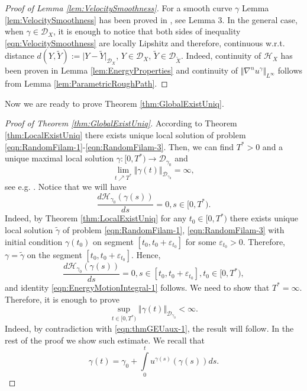 \documentclass[11pt,a4paper,leqno]{amsart}%
\theoremstyle{plain}
\theoremstyle{remark}
\theoremstyle{plain}
\numberwithin{equation}{section}
\newcommand{\eps}{\varepsilon}
\def\liml{\lim\limits}
\def\supl{\sup\limits}
\def\intl{\int\limits}
\def\supl{\mathop{\sup}\limits}
\begin{document}
\begin{proof}[Proof of Lemma \ref{lem:VelocitySmoothness}]
For a smooth curve $\gamma$ Lemma \ref{lem:VelocitySmoothness} has been proved in
\cite{[Bers+Gub_2007]}, see  Lemma 3. In the general case, when
$\gamma\in\mathcal{D}_X$, it is enough to notice that both sides
of inequality \eqref{eqn:VelocitySmoothness} are locally Lipshitz
and therefore, continuous w.r.t. distance
$d(Y,\tilde{Y}):=\vert Y-\tilde{Y}\vert_{\mathcal{D}_X}$, $Y\in\mathcal{D}_X$,
$\tilde{Y}\in\mathcal{D}_{\tilde{X}}$. Indeed, continuity of
$\mathcal{H}_X$ has been proven in Lemma
\ref{lem:EnergyProperties} and continuity of $\Vert \nabla^n
u^{\gamma}\Vert_{L^{\infty}}$ follows from Lemma
\ref{lem:ParametricRoughPath}.
\end{proof}
Now we are ready to prove Theorem \ref{thm:GlobalExistUniq}.
\begin{proof}[Proof of Theorem \ref{thm:GlobalExistUniq}]
According to Theorem \ref{thm:LocalExistUniq} there exists unique
local solution of problem
\eqref{eqn:RandomFilam-1}-\eqref{eqn:RandomFilam-3}. Then, we can
find $T^*>0$ and a  unique maximal local solution
$\gamma:[0,T^*)\to \mathcal{D}_{\gamma_0}$ and
\begin{equation}
\liml_{t\nearrow T^*}\Vert \gamma(t)\Vert_{\mathcal{D}_{\gamma_0}}=\infty,\label{eqn:thmGEUaux-1}
\end{equation}
see e.g. \cite{[Cartan-1971]}. Notice that we will have
\begin{equation}
\frac{d\mathcal{H}_{\gamma_0}(\gamma(s))}{ds}=0,s\in[0,T^*).\label{eqn:EnergyMotionIntegral-1}
\end{equation}
Indeed, by Theorem \ref{thm:LocalExistUniq} for any $t_0\in
[0,T^*)$ there exists unique local solution $\tilde{\gamma}$ of
problem \eqref{eqn:RandomFilam-1}, \eqref{eqn:RandomFilam-3} with
initial condition $\gamma(t_0)$ on segment $[t_0,t_0+\eps_{t_0}]$
for some $\eps_{t_0}>0$. Therefore, $\gamma=\tilde{\gamma}$ on the
segment $[t_0,t_0+\eps_{t_0}]$. Hence,
$$
\frac{d\mathcal{H}_{\gamma_0}(\gamma(s))}{ds}=0,s\in[t_0,t_0+\eps_{t_0}],t_0\in[0,T^*),
$$
and identity \eqref{eqn:EnergyMotionIntegral-1} follows. We need
to show that $T^*=\infty$. Therefore, it is enough to prove
$$
\supl_{t\in[0,T^*)}\Vert \gamma(t)\Vert_{\mathcal{D}_{\gamma_0}}<\infty.
$$
Indeed, by contradiction with \eqref{eqn:thmGEUaux-1}, the result
will follow. In the rest of the proof we show such estimate. We
recall that
\begin{equation}
\gamma(t)=\gamma_0+\intl_0^tu^{\gamma(s)}(\gamma(s))ds.\label{eqn:RandomFilam-12}

\end{equation}
\end{proof}
\end{document}
